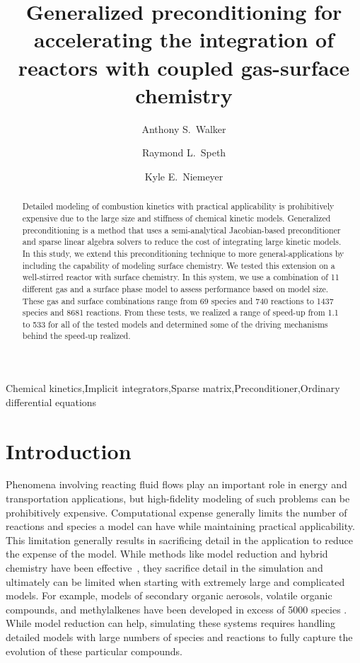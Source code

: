 \documentclass[12pt]{ussci}
\title{Generalized preconditioning for accelerating the integration of reactors with coupled gas-surface chemistry}
\author[1]{Anthony S.~Walker}
\author[2]{Raymond L.~Speth}
\author[1,*]{Kyle E.~Niemeyer}
\affil[1]{School of Mechanical, Industrial, and Manufacturing Engineering, Oregon State University, Corvallis, OR, United States}
\affil[2]{Department of Aeronautics and Astronautics, Massachusetts Institute of Technology, Cambridge, MA, United States}
\begin{document}
\maketitle

\begin{abstract} %
    Detailed modeling of combustion kinetics with practical applicability is prohibitively expensive due to the large size and stiffness of chemical kinetic models.
    Generalized preconditioning is a method that uses a semi-analytical Jacobian-based preconditioner and sparse linear algebra solvers to reduce the cost of integrating large kinetic models.
    In this study, we extend this preconditioning technique to more general-applications by including the capability of modeling surface chemistry.
    We tested this extension on a well-stirred reactor with surface chemistry.
    In this system, we use a combination of 11 different gas and a surface phase model to assess performance based on model size.
    These gas and surface combinations range from 69 species and 740 reactions to 1437 species and 8681 reactions.
    From these tests, we realized a range of speed-up from 1.1 to 533 for all of the tested models and determined some of the driving mechanisms behind the speed-up realized.
\end{abstract}

\begin{keyword}
Chemical kinetics\sep Implicit integrators\sep Sparse matrix\sep Preconditioner\sep Ordinary diﬀerential equations
\end{keyword}

\section{Introduction}

Phenomena involving reacting fluid flows play an important role in energy and transportation applications, but high-fidelity modeling of such problems can be prohibitively expensive.
Computational expense generally limits the number of reactions and species a model can have while maintaining practical applicability.
This limitation generally results in sacrificing detail in the application to reduce the expense of the model.
While methods like model reduction and hybrid chemistry have been effective~\cite{Lu2009, Pepiot2019}, they sacrifice detail in the simulation and ultimately can be limited when starting with extremely large and complicated models.
For example, models of secondary organic aerosols, volatile organic compounds, and methylalkenes have been developed in excess of 5000 species \cite{saunders1997world, li_modeling_2015, sarathy_comprehensive_2011}.
While model reduction can help, simulating these systems requires handling detailed models with large numbers of species and reactions to fully capture the evolution of these particular compounds.
\end{document}
